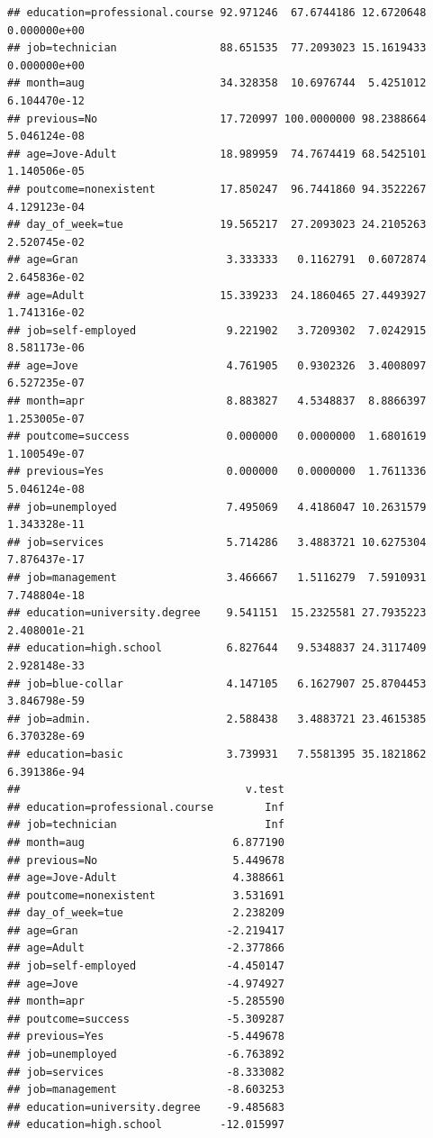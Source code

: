 \documentclass[
]{article}
\begin{document}
\begin{verbatim}
## education=professional.course 92.971246  67.6744186 12.6720648 0.000000e+00
## job=technician                88.651535  77.2093023 15.1619433 0.000000e+00
## month=aug                     34.328358  10.6976744  5.4251012 6.104470e-12
## previous=No                   17.720997 100.0000000 98.2388664 5.046124e-08
## age=Jove-Adult                18.989959  74.7674419 68.5425101 1.140506e-05
## poutcome=nonexistent          17.850247  96.7441860 94.3522267 4.129123e-04
## day_of_week=tue               19.565217  27.2093023 24.2105263 2.520745e-02
## age=Gran                       3.333333   0.1162791  0.6072874 2.645836e-02
## age=Adult                     15.339233  24.1860465 27.4493927 1.741316e-02
## job=self-employed              9.221902   3.7209302  7.0242915 8.581173e-06
## age=Jove                       4.761905   0.9302326  3.4008097 6.527235e-07
## month=apr                      8.883827   4.5348837  8.8866397 1.253005e-07
## poutcome=success               0.000000   0.0000000  1.6801619 1.100549e-07
## previous=Yes                   0.000000   0.0000000  1.7611336 5.046124e-08
## job=unemployed                 7.495069   4.4186047 10.2631579 1.343328e-11
## job=services                   5.714286   3.4883721 10.6275304 7.876437e-17
## job=management                 3.466667   1.5116279  7.5910931 7.748804e-18
## education=university.degree    9.541151  15.2325581 27.7935223 2.408001e-21
## education=high.school          6.827644   9.5348837 24.3117409 2.928148e-33
## job=blue-collar                4.147105   6.1627907 25.8704453 3.846798e-59
## job=admin.                     2.588438   3.4883721 23.4615385 6.370328e-69
## education=basic                3.739931   7.5581395 35.1821862 6.391386e-94
##                                   v.test
## education=professional.course        Inf
## job=technician                       Inf
## month=aug                       6.877190
## previous=No                     5.449678
## age=Jove-Adult                  4.388661
## poutcome=nonexistent            3.531691
## day_of_week=tue                 2.238209
## age=Gran                       -2.219417
## age=Adult                      -2.377866
## job=self-employed              -4.450147
## age=Jove                       -4.974927
## month=apr                      -5.285590
## poutcome=success               -5.309287
## previous=Yes                   -5.449678
## job=unemployed                 -6.763892
## job=services                   -8.333082
## job=management                 -8.603253
## education=university.degree    -9.485683
## education=high.school         -12.015997

\end{verbatim}
\end{document}
